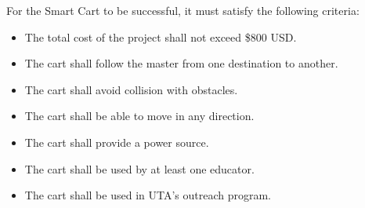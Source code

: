 For the Smart Cart to be successful, it must satisfy the following criteria:
\begin{itemize}
	\item The total cost of the project shall not exceed \$800 USD. 
	\item The cart shall follow the master from one destination to another.
	\item The cart shall avoid collision with obstacles.
	\item The cart shall be able to move in any direction.
	\item The cart shall provide a power source.
	\item The cart shall be used by at least one educator.
	\item The cart shall be used in UTA's outreach program.
\end{itemize}